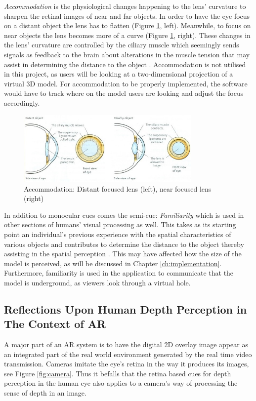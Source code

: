 \textit{Accommodation} is the physiological changes happening to the lens’ curvature to sharpen the retinal images of near and far objects. In order to have the eye focus on a distant object the lens has to flatten (Figure \ref{fig:cue10}, left). Meanwhile, to focus on near objects the lens becomes more of a curve (Figure \ref{fig:cue10}, right). These changes in the lens’ curvature are controlled by the ciliary muscle which seemingly sends signals as feedback to the brain about alterations in the muscle tension that may assist in determining the distance to the object \cite{Gale}. Accommodation is not utilised in this project, as users will be looking at a two-dimensional projection of a virtual 3D model. For accommodation to be properly implemented, the software would have to track where on the model users are looking and adjust the focus accordingly.

\begin{figure}[h!]
   \centering
   \includegraphics[width=0.8\textwidth]{figures/cue10.jpg}
   \caption{Accommodation: Distant focused lens (left), near focused lens (right) \cite{Biology2014}}\label{fig:cue10}
\end{figure}\pagebreak

In addition to monocular cues comes the semi-cue: \textit{Familiarity} which is used in other sections of humans’ visual processing as well. This takes as its starting point an individual’s previous experience with the spatial characteristics of various objects and contributes to determine the distance to the object thereby assisting in the spatial perception \cite{Gale}. This may have affected how the size of the model is perceived, as will be discussed in Chapter \ref{ch:implementation}. Furthermore, familiarity is used in the application to communicate that the model is underground, as viewers look through a virtual hole.

\subsection{Reflections Upon Human Depth Perception in The Context of AR}
A major part of an AR system is to have the digital 2D overlay image appear as an integrated part of the real world environment generated by the real time video transmission. Cameras imitate the eye’s retina in the way it produces its images, see Figure \ref{fig:camera}. Thus it befalls that the retina based cues for depth perception in the human eye also applies to a camera’s way of processing the sense of depth in an image.

